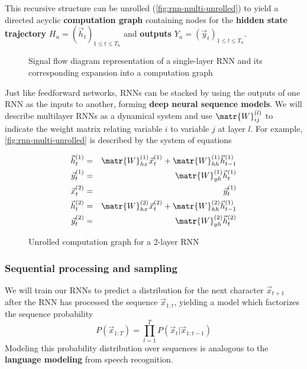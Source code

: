 This recursive structure can be unrolled
(\autoref{fig:rnn-multi-unrolled}) to yield a directed acyclic
\textbf{computation graph} containing nodes for the
\textbf{hidden state trajectory} $H_n = (\vec{h}_t)_{1 \leq t \leq T_n}$ and
\textbf{outputs} $Y_n = (\vec{y}_t)_{1 \leq t \leq T_n}$.

\begin{figure}[htpb]
    \centering
    
    \caption{Signal flow diagram representation of a single-layer RNN and its corresponding
    expansion into a computation graph}
    \label{fig:rnn-single-unrolled}
\end{figure}

Just like feedforward networks, RNNs can be stacked by using the outputs of one
RNN as the inputs to another, forming \textbf{deep neural sequence models}. We
will describe multilayer RNNs as a dynamical system and use
$\matr{W}^{(l)}_{ij}$ to indicate the weight matrix relating variable $i$ to
variable $j$ at layer $l$. For example, \autoref{fig:rnn-multi-unrolled} is described
by the system of equations

\begin{eqnarray}
    \vec{h}^{(1)}_t &=& \matr{W}^{(1)}_{hx} \vec{x}^{(1)}_t + \matr{W}^{(1)}_{hh} \vec{h}^{(1)}_{t-1} \\
    \vec{y}^{(1)}_t &=& \matr{W}^{(1)}_{yh} \vec{h}^{(1)}_t \\
    \vec{x}^{(2)}_t &=& \vec{y}^{(1)}_t \\
    \vec{h}^{(2)}_t &=& \matr{W}^{(2)}_{hx} \vec{x}^{(2)}_t + \matr{W}^{(2)}_{hh} \vec{h}^{(1)}_{t-1} \\
    \vec{y}^{(2)}_t &=& \matr{W}^{(2)}_{yh} \vec{h}^{(2)}_t \\
\end{eqnarray}

\begin{figure}[htpb]
    \centering
    
    \caption{Unrolled computation graph for a 2-layer RNN}
    \label{fig:rnn-multi-unrolled}
\end{figure}

\subsubsection{Sequential processing and sampling}

We will train our RNNs to predict a distribution for the next character
$\vec{x}_{t+1}$ after the RNN has processed the sequence $\vec{x}_{1:t}$,
yielding a model which factorizes the sequence probability
\begin{equation}
    P(\vec{x}_{1:T}) = \prod_{t=1}^T P(\vec{x}_t | \vec{x}_{1:t-1} )
\end{equation}
Modeling this probability distribution over sequences is analogous to the
\textbf{language modeling} from speech recognition.

